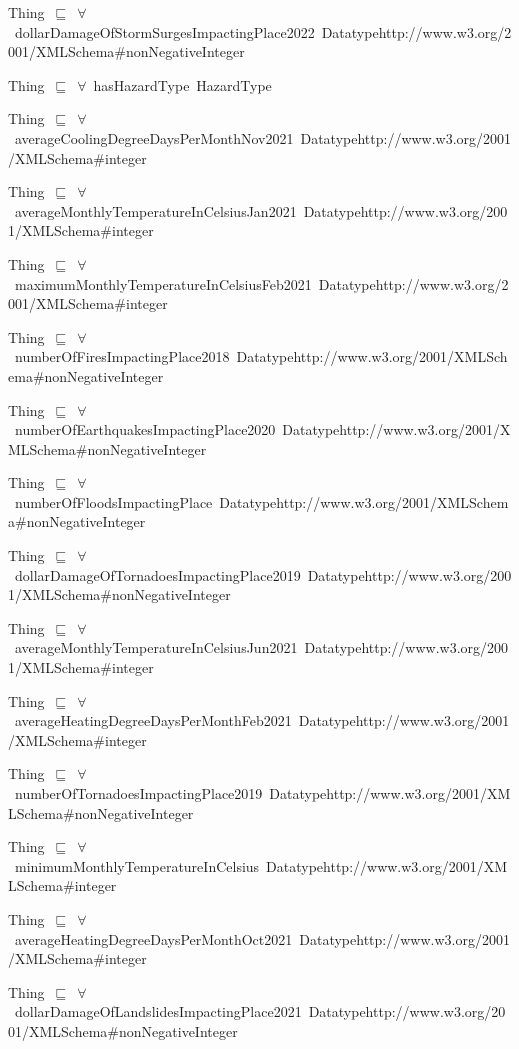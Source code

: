 \documentclass{article}
\begin{document}
Thing~\ensuremath{\sqsubseteq}~\ensuremath{\forall}~dollarDamageOfStormSurgesImpactingPlace2022~Datatypehttp://www.w3.org/2001/XMLSchema#nonNegativeInteger~

Thing~\ensuremath{\sqsubseteq}~\ensuremath{\forall}~hasHazardType~HazardType~

Thing~\ensuremath{\sqsubseteq}~\ensuremath{\forall}~averageCoolingDegreeDaysPerMonthNov2021~Datatypehttp://www.w3.org/2001/XMLSchema#integer~

Thing~\ensuremath{\sqsubseteq}~\ensuremath{\forall}~averageMonthlyTemperatureInCelsiusJan2021~Datatypehttp://www.w3.org/2001/XMLSchema#integer~

Thing~\ensuremath{\sqsubseteq}~\ensuremath{\forall}~maximumMonthlyTemperatureInCelsiusFeb2021~Datatypehttp://www.w3.org/2001/XMLSchema#integer~

Thing~\ensuremath{\sqsubseteq}~\ensuremath{\forall}~numberOfFiresImpactingPlace2018~Datatypehttp://www.w3.org/2001/XMLSchema#nonNegativeInteger~

Thing~\ensuremath{\sqsubseteq}~\ensuremath{\forall}~numberOfEarthquakesImpactingPlace2020~Datatypehttp://www.w3.org/2001/XMLSchema#nonNegativeInteger~

Thing~\ensuremath{\sqsubseteq}~\ensuremath{\forall}~numberOfFloodsImpactingPlace~Datatypehttp://www.w3.org/2001/XMLSchema#nonNegativeInteger~

Thing~\ensuremath{\sqsubseteq}~\ensuremath{\forall}~dollarDamageOfTornadoesImpactingPlace2019~Datatypehttp://www.w3.org/2001/XMLSchema#nonNegativeInteger~

Thing~\ensuremath{\sqsubseteq}~\ensuremath{\forall}~averageMonthlyTemperatureInCelsiusJun2021~Datatypehttp://www.w3.org/2001/XMLSchema#integer~

Thing~\ensuremath{\sqsubseteq}~\ensuremath{\forall}~averageHeatingDegreeDaysPerMonthFeb2021~Datatypehttp://www.w3.org/2001/XMLSchema#integer~

Thing~\ensuremath{\sqsubseteq}~\ensuremath{\forall}~numberOfTornadoesImpactingPlace2019~Datatypehttp://www.w3.org/2001/XMLSchema#nonNegativeInteger~

Thing~\ensuremath{\sqsubseteq}~\ensuremath{\forall}~minimumMonthlyTemperatureInCelsius~Datatypehttp://www.w3.org/2001/XMLSchema#integer~

Thing~\ensuremath{\sqsubseteq}~\ensuremath{\forall}~averageHeatingDegreeDaysPerMonthOct2021~Datatypehttp://www.w3.org/2001/XMLSchema#integer~

Thing~\ensuremath{\sqsubseteq}~\ensuremath{\forall}~dollarDamageOfLandslidesImpactingPlace2021~Datatypehttp://www.w3.org/2001/XMLSchema#nonNegativeInteger~
\end{document}
